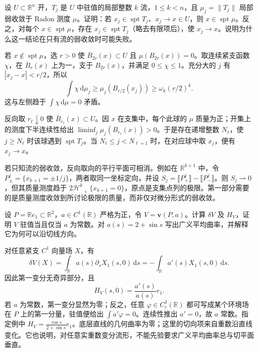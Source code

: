 \begin{exercise}\label{g3:ex:stationary-support-under-mass-convergence}
	设 \(U\subset\mathbb R^n\) 开，\(T_j\) 是 \(U\) 中驻值的局部整数 \(k\) 流，\(1\le k<n\)，且 \(\mu_j=\|T_j\|\) 局部弱收敛于 Radon 测度 \(\mu\)。证明：若 \(x_j\in\operatorname{spt}T_j\)、\(x_j\to x\in U\)，则 \(x\in\operatorname{spt}\mu\)。反之，对每个 \(x\in\operatorname{spt}\mu\)，存在 \(x_j\in\operatorname{spt}T_j\)（略去有限项后），使 \(x_j\to x\)。说明为什么这一结论在只有流的弱收敛时可能失败。
\end{exercise}
\begin{solution}
	若 \(x\notin\operatorname{spt}\mu\)，选 \(r>0\) 使 \(\overline B_{2r}(x)\subset U\) 且 \(\mu(B_{2r}(x))=0\)。取连续紧支函数 \(\chi\)，在 \(\overline B_r(x)\) 上为一，支于 \(B_{2r}(x)\)，并满足 \(0\le\chi\le1\)。充分大的 \(j\) 有 \(|x_j-x|<r/2\)，所以
	\[
		\int\chi\,\mathrm d\mu_j
		\ge\mu_j(B_{r/2}(x_j))\ge\omega_k(r/2)^k.
	\]
	这与左侧趋于 \(\int\chi\,\mathrm d\mu=0\) 矛盾。

	反向取 \(r_\ell\downarrow0\) 使 \(\overline B_{r_\ell}(x)\subset U\)。因 \(x\) 在支集中，每个此球的 \(\mu\) 质量为正；开集上的测度下半连续性给出
	\(\liminf_j\mu_j(B_{r_\ell}(x))>0\)。于是存在递增整数 \(N_\ell\)，使 \(j\ge N_\ell\) 时该球遇到 \(\operatorname{spt}T_j\)。当 \(N_\ell\le j<N_{\ell+1}\) 时，在对应球中取 \(x_j\)，便有 \(x_j\to x\)。

	若只知流的弱收敛，反向取向的平行平面可相消。例如在 \(\mathbb R^{k+1}\) 中，令 \(P_\pm^j=\{x_{k+1}=\pm1/j\}\)，两者取同一坐标定向，并设
	\(S_j=\lBrack P_+^j\rBrack-\lBrack P_-^j\rBrack\)。则 \(S_j\rightharpoonup0\)，但其质量测度趋于 \(2\mathcal H^k\llcorner\{x_{k+1}=0\}\)，原点是支集点列的极限。第一部分需要的是质量测度收敛到所讨论极限的质量，而非仅对微分形式的弱收敛。
\end{solution}

\begin{optionalexercise}\label{g3:ex:varifold-variable-density}
	设 \(P=\mathbb Re_1\subset\mathbb R^2\)，\(a\in C^1(\mathbb R)\) 严格为正，令 \(V=\mathbf v(P,a)\)。计算 \(\delta V\) 及 \(H_V\)，证明 \(V\) 驻值当且仅当 \(a\) 为常数。对 \(a(s)=2+\sin s\) 写出广义平均曲率，并解释它为何可以沿切线方向。
\end{optionalexercise}
\begin{solution}
	对任意紧支 \(C^1\) 向量场 \(X\)，有
	\[
		\delta V(X)=\int_{\mathbb R}a(s)\partial_sX_1(s,0)\,\mathrm ds
		=-\int_{\mathbb R}a'(s)X_1(s,0)\,\mathrm ds.
	\]
	因此第一变分无奇异部分，且
	\[
		H_V(s,0)=\frac{a'(s)}{a(s)}e_1.
	\]
	若 \(a\) 为常数，第一变分显然为零；反之，任意 \(\varphi\in C_c^1(\mathbb R)\) 都可写成某个环境场在 \(P\) 上的第一分量，驻值便给出 \(\int a'\varphi=0\)。连续性推出 \(a'=0\)，故 \(a\) 常数。指定例中
	\(H_V=\frac{\cos s}{2+\sin s}e_1\)。底层直线的几何曲率为零；这里的切向项来自重数沿直线变化。它也说明，对任意实重数变分流形，不能先验要求广义平均曲率总与切平面垂直。
\end{solution}

